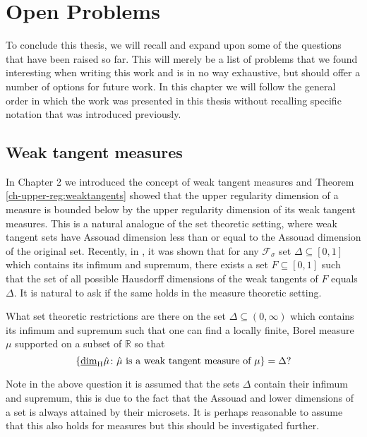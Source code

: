 \chapter{Open Problems}
\label{chap:conclusion}



To conclude this thesis, we will recall and expand upon some of the questions that have been raised so far. This will merely be a list of problems that we found interesting when writing this work and is in no way exhaustive, but should offer a number of options for future work. In this chapter we will follow the general order in which the work was presented in this thesis without recalling specific notation that was introduced previously.


\section{Weak tangent measures}\label{ch-conclusion:weak-tangents}

In Chapter 2 we introduced the concept of weak tangent measures and Theorem \ref{ch-upper-reg:weaktangents} showed that the upper regularity dimension of a measure is bounded below by the upper regularity dimension of its weak tangent measures. This is a natural analogue of the set theoretic setting, where weak tangent sets have Assouad dimension less than or equal to the Assouad dimension of the original set. Recently, in \cite{microsets}, it was shown that for any $\mathcal{F}_{\sigma}$ set $\Delta \subseteq [0,1]$ which contains its infimum and supremum, there exists a set $F \subseteq [0,1]$ such that the set of all possible Hausdorff dimensions of the weak tangents of $F$ equals $\Delta$. It is natural to ask if the same holds in the measure theoretic setting.

\begin{question}
What set theoretic restrictions are there on the set $\Delta \subseteq (0,\infty)$ which contains its infimum and supremum such that one can find a locally finite, Borel measure $\mu$ supported on a subset of $\mathbb{R}$ so that
\[
\left\{ \underline{\dim}_{\textup{H}} \hat{\mu} \colon \hat{\mu} \textup{ is a weak tangent measure of } \mu \right\} = \Delta ?
\]
\end{question}

Note in the above question it is assumed that the sets $\Delta$ contain their infimum and supremum, this is due to the fact that the Assouad and lower dimensions of a set is always attained by their microsets. It is perhaps reasonable to assume that this also holds for measures but this should be investigated further.

